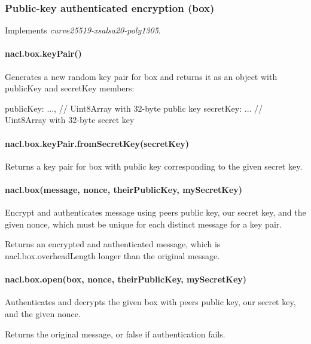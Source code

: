 \subsubsection*{Public-\/key authenticated encryption (box)}

Implements {\itshape curve25519-\/xsalsa20-\/poly1305}.

\paragraph*{nacl.\+box.\+key\+Pair()}

Generates a new random key pair for box and returns it as an object with {\ttfamily public\+Key} and {\ttfamily secret\+Key} members\+: \begin{DoxyVerb}{
   publicKey: ...,  // Uint8Array with 32-byte public key
   secretKey: ...   // Uint8Array with 32-byte secret key
}
\end{DoxyVerb}


\paragraph*{nacl.\+box.\+key\+Pair.\+from\+Secret\+Key(secret\+Key)}

Returns a key pair for box with public key corresponding to the given secret key.

\paragraph*{nacl.\+box(message, nonce, their\+Public\+Key, my\+Secret\+Key)}

Encrypt and authenticates message using peer\textquotesingle{}s public key, our secret key, and the given nonce, which must be unique for each distinct message for a key pair.

Returns an encrypted and authenticated message, which is {\ttfamily nacl.\+box.\+overhead\+Length} longer than the original message.

\paragraph*{nacl.\+box.\+open(box, nonce, their\+Public\+Key, my\+Secret\+Key)}

Authenticates and decrypts the given box with peer\textquotesingle{}s public key, our secret key, and the given nonce.

Returns the original message, or {\ttfamily false} if authentication fails.


